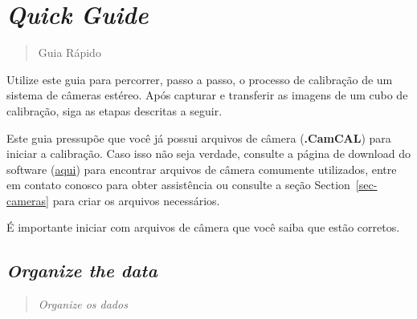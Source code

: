 \documentclass[
  12pt,
  letterpaper,
  DIV=11,
  numbers=noendperiod]{scrreprt}
\begin{document}
\section{\texorpdfstring{\emph{Quick
Guide}}{Quick Guide}}\label{quick-guide}

\begin{quote}
Guia Rápido
\end{quote}

Utilize este guia para percorrer, passo a passo, o processo de
calibração de um sistema de câmeras estéreo. Após capturar e transferir
as imagens de um cubo de calibração, siga as etapas descritas a seguir.

Este guia pressupõe que você já possui arquivos de câmera
(\textbf{.CamCAL}) para iniciar a calibração. Caso isso não seja
verdade, consulte a página de download do software
(\href{https://www.seagis.com.au/download.php}{aqui}) para encontrar
arquivos de câmera comumente utilizados, entre em contato conosco para
obter assistência ou consulte a seção Section~\ref{sec-cameras} para
criar os arquivos necessários.

\begin{tcolorbox}[enhanced jigsaw, opacityback=0, colback=white, colframe=quarto-callout-caution-color-frame, left=2mm, leftrule=.75mm, toprule=.15mm, rightrule=.15mm, breakable, arc=.35mm, bottomrule=.15mm]
\begin{minipage}[t]{5.5mm}
\textcolor{quarto-callout-caution-color}{\faFire}
\end{minipage}%
\begin{minipage}[t]{\textwidth - 5.5mm}

É importante iniciar com arquivos de câmera que você saiba que estão
corretos.

\end{minipage}%
\end{tcolorbox}

\subsection{\texorpdfstring{\emph{Organize the
data}}{Organize the data}}\label{organize-the-data}

\begin{quote}
\emph{Organize os dados}
\end{quote}
\end{document}
